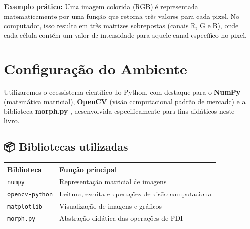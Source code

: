 \documentclass[
  portuguese,
  letterpaper,
  openany,
  oneside,
  12pt,
  a4paper]{book}
\begin{document}
\textbf{Exemplo prático:} Uma imagem colorida (RGB) é representada
matematicamente por uma função que retorna três valores para cada pixel.
No computador, isso resulta em três matrizes sobrepostas (canais R, G e
B), onde cada célula contém um valor de intensidade para aquele canal
específico no pixel.

\section{Configuração do Ambiente}\label{configurauxe7uxe3o-do-ambiente}

Utilizaremos o ecossistema científico do Python, com destaque para o
\textbf{NumPy} (matemática matricial), \textbf{OpenCV} (visão
computacional padrão de mercado) e a biblioteca \textbf{morph.py}
\autocite{zampirolli2025morph}, desenvolvida especificamente para fins
didáticos neste livro.

\subsection{📦 Bibliotecas utilizadas}\label{bibliotecas-utilizadas}

\begin{longtable}[]{@{}
  >{\raggedright\arraybackslash}p{}
  >{\raggedright\arraybackslash}p{}@{}}
\toprule\noalign{}
\begin{minipage}[b]{\linewidth}\raggedright
Biblioteca
\end{minipage} & \begin{minipage}[b]{\linewidth}\raggedright
Função principal
\end{minipage} \\
\midrule\noalign{}
\endhead
\bottomrule\noalign{}
\endlastfoot
\texttt{numpy} & Representação matricial de imagens \\
\texttt{opencv-python} & Leitura, escrita e operações de visão
computacional \\
\texttt{matplotlib} & Visualização de imagens e gráficos \\
\texttt{morph.py} & Abstração didática das operações de PDI \\
\end{longtable}
\end{document}
